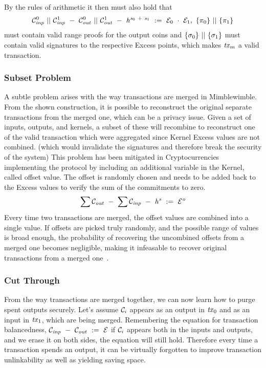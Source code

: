 By the rules of arithmetic it then must also hold that
\[ \mathcal{C}_{\mathit{inp}}^0 ~||~ \mathcal{C}_{\mathit{inp}}^1 ~-~ \mathcal{C}_{\mathit{out}}^0 ~||~ \mathcal{C}_{\mathit{out}}^1 ~-~ \mathit{h}^{\mathit{s}_0 ~+~ \mathit{s}_1} ~:=~ \mathcal{E}_0 ~\cdot~ \mathcal{E}_1 ,~ \{\pi_0\} ~||~ \{\pi_1\} \]
must contain valid range proofs for the output coins and $\{\sigma_0\} ~||~ \{\sigma_1\}$ must contain valid signatures to the respective Excess points, which makes $\mathit{tx}_m$ a valid transaction.

\subsubsection{Subset Problem \label{sec:pre:mimblewimble:subset}}
A subtle problem arises with the way transactions are merged in Mimblewimble. From the shown construction, it is possible to reconstruct the original separate transactions from the merged one,
which can be a privacy issue. Given a set of inputs, outputs, and kernels, a subset of these will recombine to reconstruct one of the valid transaction which were aggregated since Kernel Excess values are not combined.
(which would invalidate the signatures and therefore break the security of the system) This problem has been mitigated in Cryptocurrencies implementing the protocol by including an
additional variable in the Kernel, called offset value. The offset is randomly chosen and needs to be added back to the Excess values to verify the sum of the commitments to zero.
\[ \sum{\mathcal{C}_{\mathit{out}}} ~-~ \sum\mathcal{C}_{\mathit{inp}} ~-~ \mathit{h}^{\mathit{s}} ~:=~ \mathcal{E}^{\mathit{o}} \]
Every time two transactions are merged, the offset values are combined into a single value. If offsets are picked truly randomly, and the possible range of values is broad enough, the probability of recovering the
uncombined offsets from a merged one becomes negligible, making it infeasable to recover original transactions from a merged one~\cite{poelstra2016mimblewimble}.



\subsubsection{Cut Through \label{sec:pre:mimblewimble:cut}}
From the way transactions are merged together, we can now learn how to purge spent outputs securely. Let's assume $\mathcal{C}_i$ appears as an output in $\mathit{tx}_0$ and as an input in $\mathit{tx}_1$,
which are being merged. Remembering the equation for transaction balancedness, $\mathcal{C}_{\mathit{inp}} ~-~ \mathcal{C}_{\mathit{out}} ~:=~ \mathcal{E}$ if $\mathcal{C}_i$ appears both in the inputs and outputs, and we erase it on both sides, the equation will still hold.
Therefore every time a transaction spends an output, it can be virtually forgotten to improve transaction unlinkability as well as yielding saving space.

